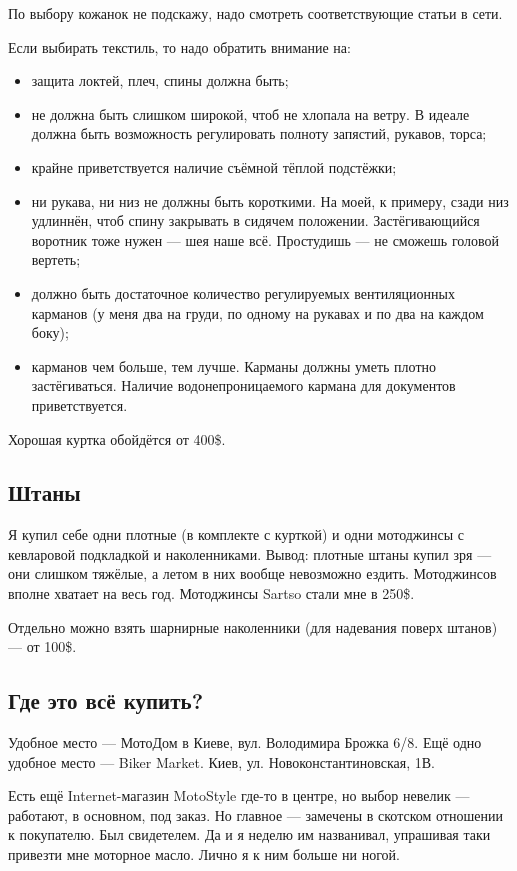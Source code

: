 \documentclass[12pt,a4paper]{article}
\begin{document}
По выбору кожанок не подскажу, надо смотреть соответствующие статьи
в сети.

Если выбирать текстиль, то надо обратить внимание на:

\begin{itemize}
\item защита локтей, плеч, спины должна быть;
\item не должна быть слишком широкой, чтоб не хлопала на ветру.
В идеале должна быть возможность регулировать полноту запястий,
рукавов, торса;
\item крайне приветствуется наличие съёмной тёплой подстёжки;
\item ни рукава, ни низ не должны быть короткими. На моей, к примеру,
сзади низ удлиннён, чтоб спину закрывать в сидячем положении.
Застёгивающийся воротник тоже нужен --- шея наше всё. Простудишь --- не
сможешь головой вертеть;
\item должно быть достаточное количество регулируемых вентиляционных
карманов (у меня два на груди, по одному на рукавах и по два на каждом
боку);
\item карманов чем больше, тем лучше. Карманы должны уметь плотно
застёгиваться. Наличие водонепроницаемого кармана для документов
приветствуется.
\end{itemize}

Хорошая куртка обойдётся от 400\$.

\subsection{Штаны}

Я купил себе одни плотные (в комплекте с курткой) и одни мотоджинсы с
кевларовой подкладкой и наколенниками. Вывод: плотные штаны купил зря ---
они слишком тяжёлые, а летом в них вообще невозможно ездить.
Мотоджинсов вполне хватает на весь год. Мотоджинсы Sartso стали мне в
250\$.

Отдельно можно взять шарнирные наколенники (для надевания поверх
штанов) --- от 100\$.

\subsection{Где это всё купить?}

Удобное место --- МотоДом в Киеве, вул. Володимира Брожка 6/8.
Ещё одно удобное место --- Biker Market. Киев, ул. Новоконстантиновская, 1В.

Есть ещё Internet-магазин MotoStyle где-то в центре, но выбор невелик ---
работают, в основном, под заказ. Но главное --- замечены в скотском
отношении к покупателю. Был свидетелем. Да и я неделю им названивал,
упрашивая таки привезти мне моторное масло. Лично я к ним больше ни
ногой.
\end{document}
